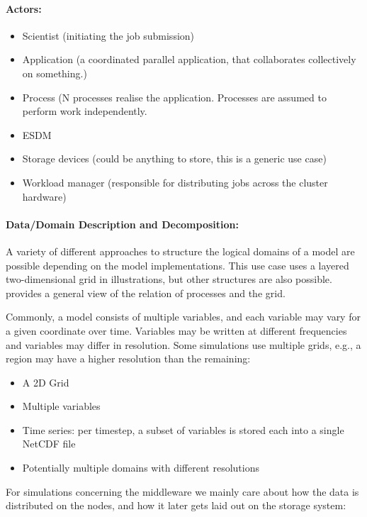 \paragraph{Actors:}
\begin{itemize}
	\item Scientist (initiating the job submission)
	\item Application (a coordinated parallel application, that collaborates collectively on something.)
	\item Process (N processes realise the application. Processes are assumed to perform work independently.
	\item ESDM
	\item Storage devices (could be anything to store, this is a generic use case)
	\item Workload manager (responsible for distributing jobs across the cluster hardware)
\end{itemize}


\paragraph{Data/Domain Description and Decomposition:}
A variety of different approaches to structure the logical domains of a model are possible depending on the model implementations.
This use case uses a layered two-dimensional grid in illustrations, but other structures are also possible.
 provides a general view of the relation of processes and the grid.

Commonly, a model consists of multiple variables, and each variable may vary for a given coordinate over time.
Variables may be written at different frequencies and variables may differ in resolution.
Some simulations use multiple grids, e.g., a region may have a higher resolution than the remaining:

\begin{itemize}
	\item A 2D Grid
	\item Multiple variables
	\item Time series: per timestep, a subset of variables is stored each into a single NetCDF file
	\item Potentially multiple domains with different resolutions
\end{itemize}


For simulations concerning the middleware we mainly care about how the data is distributed on the nodes, and how it later gets laid out on the storage system:


